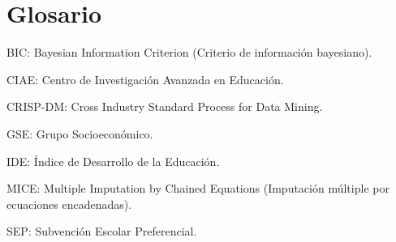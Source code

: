 \chapter*{Glosario}

BIC: Bayesian Information Criterion (Criterio de información bayesiano).

CIAE: Centro de Investigación Avanzada en Educación.

CRISP-DM: Cross Industry Standard Process for Data Mining.

GSE: Grupo Socioeconómico.

IDE: Índice de Desarrollo de la Educación.

MICE: Multiple Imputation by Chained Equations (Imputación múltiple por ecuaciones encadenadas).

SEP: Subvención Escolar Preferencial.